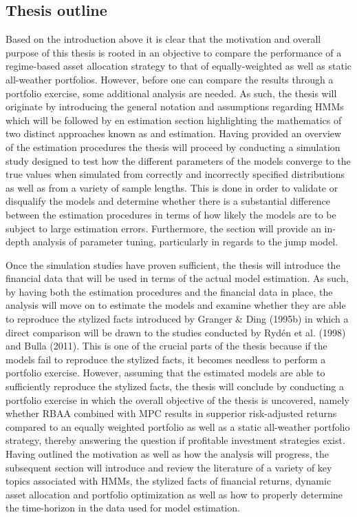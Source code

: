 

\subsection{Thesis outline}
Based on the introduction above it is clear that the motivation and overall purpose of this thesis is rooted in an objective to compare the performance of a regime-based asset allocation strategy to that of equally-weighted as well as static all-weather portfolios. However, before one can compare the results through a portfolio exercise, some additional analysis are needed. As such, the thesis will originate by introducing the general notation and assumptions regarding HMMs which will be followed by en estimation section highlighting the mathematics of two distinct approaches known as \mle and \jump estimation. Having provided an overview of the estimation procedures the thesis will proceed by conducting a simulation study designed to test how the different parameters of the models converge to the true values when simulated from correctly and incorrectly specified distributions as well as from a variety of sample lengths. This is done in order to validate or disqualify the models and determine whether there is a substantial difference between the estimation procedures in terms of how likely the models are to be subject to large estimation errors. Furthermore, the section will provide an in-depth analysis of parameter tuning, particularly in regards to the jump model. 

Once the simulation studies have proven sufficient, the thesis will introduce the financial data that will be used in terms of the actual model estimation. As such, by having both the estimation procedures and the financial data in place, the analysis will move on to estimate the models and examine whether they are able to reproduce the stylized facts introduced by Granger \& Ding (1995b) in which a direct comparison will be drawn to the studies conducted by Rydén et al. (1998) and Bulla (2011). This is one of the crucial parts of the thesis because if the models fail to reproduce the stylized facts, it becomes needless to perform a portfolio exercise. However, assuming that the estimated models are able to sufficiently reproduce the stylized facts, the thesis will conclude by conducting a portfolio exercise in which the overall objective of the thesis is uncovered, namely whether RBAA combined with MPC results in supperior risk-adjusted returns compared to an equally weighted portfolio as well as a static all-weather portfolio strategy, thereby answering the question if profitable investment strategies exist. Having outlined the motivation as well as how the analysis will progress, the subsequent section will introduce and review the literature of a variety of key topics associated with HMMs, the stylized facts of financial returns, dynamic asset allocation and portfolio optimization as well as how to properly determine the time-horizon in the data used for model estimation. 

